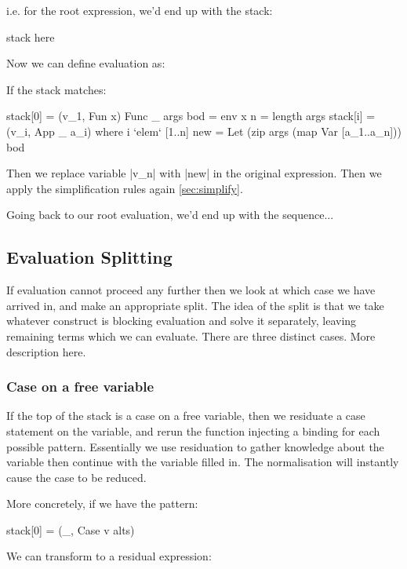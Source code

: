 \documentclass{sigplanconf}
\begin{document}
i.e. for the root expression, we'd end up with the stack:

\begin{code}
stack here
\end{code}

Now we can define evaluation as:

If the stack matches:

\begin{code}
stack[0] = (v_1, Fun x)
Func _ args bod = env x
n = length args
stack[i] = (v_i, App _ a_i)   where i `elem` [1..n]
new = Let (zip args (map Var [a_1..a_n])) bod
\end{code}

Then we replace variable |v_n| with |new| in the original expression. Then we apply the simplification rules again \ref{sec:simplify}.

Going back to our root evaluation, we'd end up with the sequence...

\subsection{Evaluation Splitting}
\label{sec:eval_split}

If evaluation cannot proceed any further then we look at which case we have arrived in, and make an appropriate split. The idea of the split is that we take whatever construct is blocking evaluation and solve it separately, leaving remaining terms which we can evaluate. There are three distinct cases. More description here.

\subsubsection{Case on a free variable}

If the top of the stack is a case on a free variable, then we residuate a case statement on the variable, and rerun the function injecting a binding for each possible pattern. Essentially we use residuation to gather knowledge about the variable then continue with the variable filled in. The normalisation will instantly cause the case to be reduced.

More concretely, if we have the pattern:

\begin{code}
stack[0] = (_, Case v alts)
\end{code}

We can transform to a residual expression:

\end{document}
